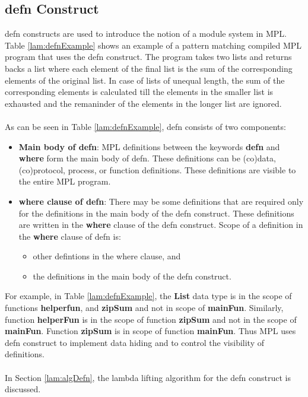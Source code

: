 \documentclass[11pt]{article}
\begin{document}
\subsection {defn Construct}\label{lam:defnOverview}
{\sf defn} constructs are used to introduce the notion of a module system in MPL. Table \ref {lam:defnExample} shows an example of a pattern matching compiled MPL program that uses the {\sf defn} construct. The program takes two lists and returns backs a list where each element of the final list is the sum of the corresponding elements of the original list. In case of lists of unequal length, the sum of the corresponding elements is calculated till the elements in the smaller list is exhausted and the remaninder of the elements in the longer list are ignored. 
~~\\~~\\
As can be seen in Table \ref {lam:defnExample}, {\sf defn} consists of two components:
\begin{itemize}
  \item {\bf Main body of defn}: MPL definitions between the keywords {\bf defn} and {\bf where} form the main body of {\sf defn}. These definitions can be (co)data, (co)protocol, process, or function definitions. These definitions are visible to the entire MPL program.

  \item {\bf where clause of defn}: There may be some definitions that are required only for the definitions in the main body of the {\sf defn} construct. These definitions are written in the {\bf where} clause of the {\sf defn} construct. Scope of a definition in the {\bf where} clause of {\sf defn} is:
  \begin{itemize}
    \item other defintions in the where clause, and
    \item the definitions in the main body of the {\sf defn} construct.
  \end{itemize}
\end{itemize}
For example, in Table \ref {lam:defnExample}, the {\bf List} data type is in the scope of functions {\bf helperfun}, and {\bf zipSum} and not in scope of {\bf mainFun}. Similarly, function {\bf helperFun} is in the scope of function {\bf zipSum} and not in the scope of {\bf mainFun}. Function {\bf zipSum} is in scope of function {\bf mainFun}. Thus MPL uses {\sf defn} construct to implement data hiding and to control the visibility of definitions.
~~\\ ~~\\
In Section \ref {lam:algDefn}, the lambda lifting algorithm for the {\sf defn} construct is discussed.
\end{document}
